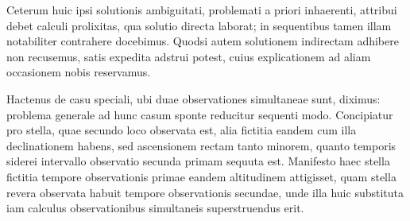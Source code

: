 Ceterum huic ipsi solutionis ambiguitati, problemati a priori inhaerenti, attribui debet calculi prolixitas, qua solutio directa laborat; in sequentibus tamen illam notabiliter contrahere docebimus. Quodsi autem solutionem indirectam adhibere non recusemus, satis expedita adstrui potest, cuius explicationem ad aliam occasionem nobis reservamus.

Hactenus de casu speciali, ubi duae observationes simultaneae sunt, diximus: problema generale ad hunc casum sponte reducitur sequenti modo. Concipiatur pro stella, quae secundo loco observata est, alia fictitia eandem cum illa declinationem habens, sed ascensionem rectam tanto minorem, quanto temporis siderei intervallo observatio secunda primam sequuta est. Manifesto haec stella fictitia tempore observationis primae eandem altitudinem attigisset, quam stella revera observata habuit tempore observationis secundae, unde illa huic substituta iam calculus observationibus simultaneis superstruendus erit.

